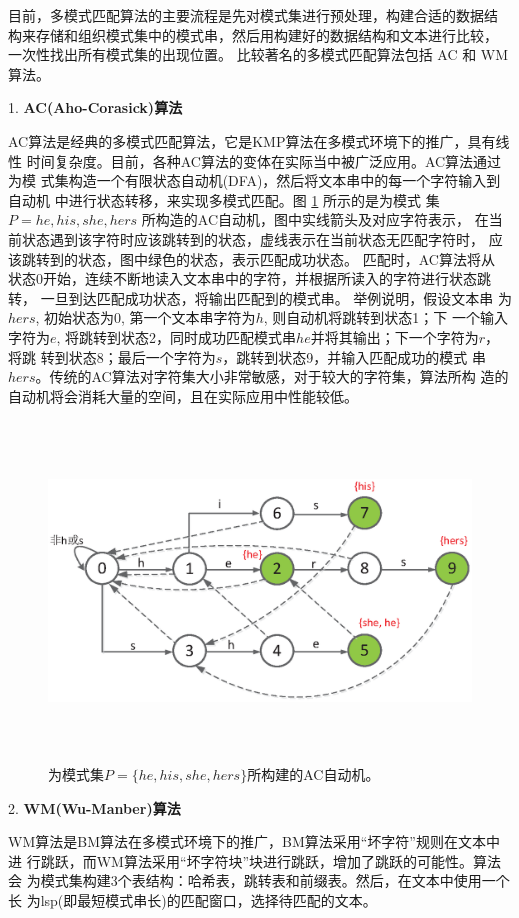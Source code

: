 目前，多模式匹配算法的主要流程是先对模式集进行预处理，构建合适的数据结
构来存储和组织模式集中的模式串，然后用构建好的数据结构和文本进行比较，
一次性找出所有模式集的出现位置。 比较著名的多模式匹配算法包括 AC
\cite{Aho1975} 和 WM \cite{Wu1994} 算法。

1. \textbf{AC(Aho-Corasick)算法}

AC算法是经典的多模式匹配算法，它是KMP算法在多模式环境下的推广，具有线性
时间复杂度。目前，各种AC算法的变体在实际当中被广泛应用。AC算法通过为模
式集构造一个有限状态自动机(DFA)，然后将文本串中的每一个字符输入到自动机
中进行状态转移，来实现多模式匹配。图 \ref{fig:AC} 所示的是为模式
集$P={he, his, she, hers}$ 所构造的AC自动机，图中实线箭头及对应字符表示，
在当前状态遇到该字符时应该跳转到的状态，虚线表示在当前状态无匹配字符时，
应该跳转到的状态，图中绿色的状态，表示匹配成功状态。 匹配时，AC算法将从
状态0开始，连续不断地读入文本串中的字符，并根据所读入的字符进行状态跳转，
一旦到达匹配成功状态，将输出匹配到的模式串。 举例说明，假设文本串
为$hers$, 初始状态为0, 第一个文本串字符为$h$, 则自动机将跳转到状态1；下
一个输入字符为$e$,
将跳转到状态2，同时成功匹配模式串$he$并将其输出；下一个字符为$r$，将跳
转到状态8；最后一个字符为$s$，跳转到状态9，并输入匹配成功的模式
串$hers$。传统的AC算法对字符集大小非常敏感，对于较大的字符集，算法所构
造的自动机将会消耗大量的空间，且在实际应用中性能较低。


\begin{figure}[!h]
  \centering
  \includegraphics[height=9cm ,width=13cm]{figures/1_Introduction/AC.eps}
  \caption{为模式集$P=\{he, his, she, hers\}$所构建的AC自动机。}
  \label{fig:AC}
\end{figure}

2. \textbf{WM(Wu-Manber)算法
}

WM算法是BM算法在多模式环境下的推广，BM算法采用“坏字符”规则在文本中进
行跳跃，而WM算法采用“坏字符块”块进行跳跃，增加了跳跃的可能性。算法会
为模式集构建3个表结构：哈希表，跳转表和前缀表。然后，在文本中使用一个长
为lsp(即最短模式串长)的匹配窗口，选择待匹配的文本。
